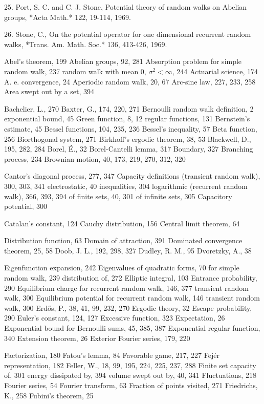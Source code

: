 25. Port, S. C. and C. J. Stone, Potential theory of random walks on Abelian groups, *Acta Math.* 122, 19-114, 1969.

26. Stone, C., On the potential operator for one dimensional recurrent random walks, *Trans. Am. Math. Soc.* 136, 413-426, 1969.

Abel's theorem, 199
Abelian groups, 92, 281
Absorption problem for simple random walk, 237
random walk with mean 0, $\sigma^2 < \infty$, 244
Actuarial science, 174
A. e. convergence, 24
Aperiodic random walk, 20, 67
Arc-sine law, 227, 233, 258
Area swept out by a set, 394

Bachelier, L., 270
Baxter, G., 174, 220, 271
Bernoulli random walk definition, 2
exponential bound, 45
Green function, 8, 12
regular functions, 131
Bernstein's estimate, 45
Bessel functions, 104, 235, 236
Bessel's inequality, 57
Beta function, 256
Biorthogonal system, 271
Birkhoff's ergodic theorem, 38, 53
Blackwell, D., 195, 282, 284
Borel, É., 32
Borel-Cantelli lemma, 317
Boundary, 327
Branching process, 234
Brownian motion, 40, 173, 219, 270, 312, 320

Cantor's diagonal process, 277, 347
Capacity definitions (transient random walk), 300, 303, 341
electrostatic, 40
inequalities, 304
logarithmic (recurrent random walk), 366, 393, 394
of finite sets, 40, 301
of infinite sets, 305
Capacitory potential, 300

Catalan's constant, 124
Cauchy distribution, 156
Central limit theorem, 64

Distribution function, 63
Domain of attraction, 391
Dominated convergence theorem, 25, 58
Doob, J. L., 192, 298, 327
Dudley, R. M., 95
Dvoretzky, A., 38

Eigenfunction expansion, 242
Eigenvalues of quadratic forms, 70 for simple random walk, 239 distribution of, 272
Elliptic integral, 103
Entrance probability, 290
Equilibrium charge for recurrent random walk, 146, 377 transient random walk, 300
Equilibrium potential for recurrent random walk, 146 transient random walk, 300
Erdős, P., 38, 41, 99, 232, 270
Ergodic theory, 32
Escape probability, 290
Euler's constant, 124, 127
Excessive function, 323
Expectation, 26
Exponential bound for Bernoulli sums, 45, 385, 387
Exponential regular function, 340
Extension theorem, 26
Exterior Fourier series, 179, 220

Factorization, 180
Fatou's lemma, 84
Favorable game, 217, 227
Fejér representation, 182
Feller, W., 18, 99, 195, 224, 225, 237, 288
Finite set capacity of, 301 energy dissipated by, 394 volume swept out by, 40, 341
Fluctuations, 218
Fourier series, 54
Fourier transform, 63
Fraction of points visited, 271
Friedrichs, K., 258
Fubini's theorem, 25

